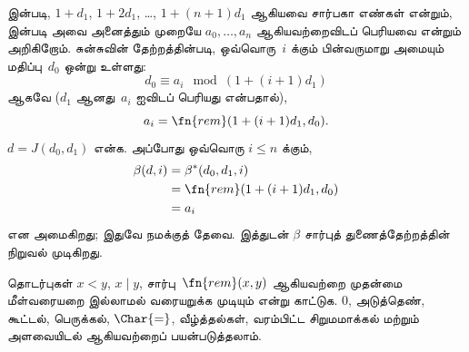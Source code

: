 \documentclass[../../../include/open-logic-section]{subfiles}
\begin{document}
 இன்படி, $1+d_1$, $1+2 d_1$, \dots,
$1+(n+1) d_1$ ஆகியவை சார்பகா எண்கள் என்றும்,  இன்படி
அவை அனைத்தும் முறையே $a_0,\dots,a_n$ ஆகியவற்றைவிடப் பெரியவை என்றும்
அறிகிறோம். சுன்சுவின் தேற்றத்தின்படி, ஒவ்வொரு~$i$ க்கும் பின்வருமாறு
அமையும் மதிப்பு~$d_0$ ஒன்று உள்ளது:
\[
d_0 \equiv a_i \mod (1+(i+1)d_1)
\]
ஆகவே ($d_1$ ஆனது~$a_i$ ஐவிடப் பெரியது என்பதால்),
\[
a_i = \fn{rem}(1+(i+1)d_1,d_0).
\]
$d = J(d_0,d_1)$ என்க. அப்போது ஒவ்வொரு $i \le n$ க்கும்,
\begin{align*}
\beta(d,i) & =  \beta^*(d_0,d_1,i) \\
& =  \fn{rem}(1+(i+1) d_1,d_0) \\
& =  a_i
\end{align*}
என அமைகிறது; இதுவே நமக்குத் தேவை. இத்துடன் $\beta$ சார்புத்
துணைத்தேற்றத்தின் நிறுவல் முடிகிறது.

\begin{prob}
  தொடர்புகள் $x < y$, $x \mid y$, சார்பு~$\fn{rem}(x,y)$ ஆகியவற்றை
  முதன்மை மீள்வரையறை இல்லாமல் வரையறுக்க முடியும் என்று காட்டுக. $0$,
  அடுத்தெண், கூட்டல், பெருக்கல், $\Char{=}$, வீழ்த்தல்கள், வரம்பிட்ட
  சிறுமமாக்கல் மற்றும் அளவையிடல் ஆகியவற்றைப் பயன்படுத்தலாம்.
\end{prob}
\end{document}
